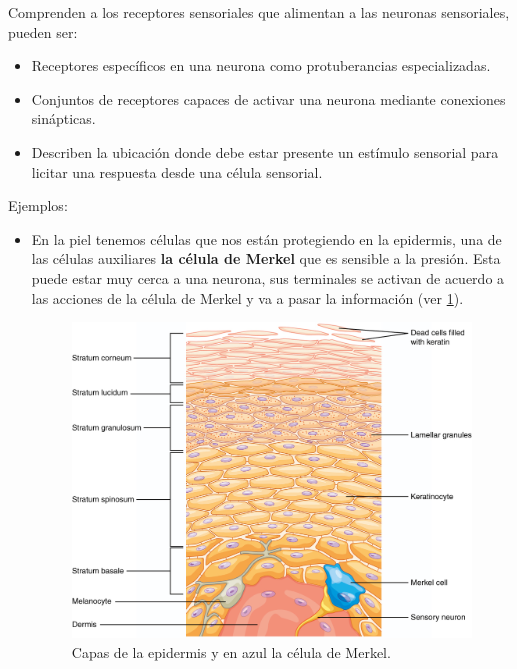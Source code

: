 Comprenden a los receptores sensoriales que alimentan a las neuronas sensoriales, pueden ser:


\begin{itemize}
\item Receptores específicos en una neurona como protuberancias especializadas. 
\item Conjuntos de receptores capaces de activar una neurona mediante conexiones sinápticas. 
\item Describen la ubicación donde debe estar presente un estímulo sensorial para licitar una respuesta desde una célula sensorial. 
\end{itemize}


Ejemplos:


\begin{itemize}
\item En la piel tenemos células que nos están protegiendo en la epidermis, una de las células auxiliares \textbf{la célula de Merkel} que es
sensible a la presión. Esta puede estar muy cerca a una neurona, sus terminales se activan de acuerdo a las acciones de la célula de Merkel y va a pasar la información (ver \ref{fig:mer}).  
 	
\begin{figure}[h]
 \centering
 \includegraphics[scale=0.2]{../Figuras/merkel.png}
 \caption{Capas de la epidermis y en azul la célula de Merkel.}
 \label{fig:mer}
\end{figure}



\end{itemize}
